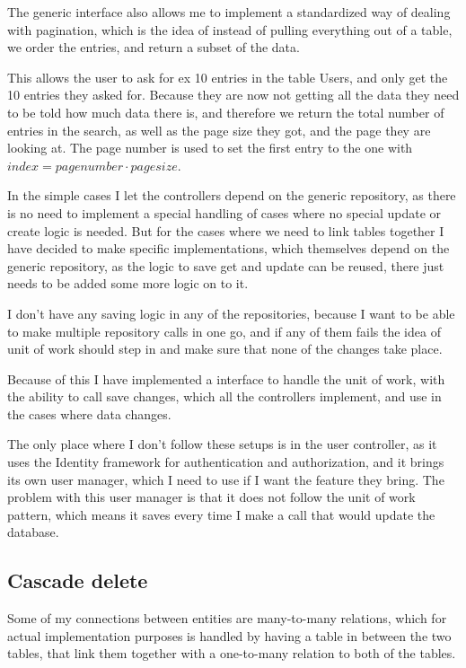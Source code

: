 The generic interface also allows me to implement a standardized way of dealing
with pagination, which is the idea of instead of pulling everything out of a
table, we order the entries, and return a subset of the data. 

This allows the user to ask for ex 10 entries in the table Users, and only get
the 10 entries they asked for. Because they are now not getting all the data
they need to be told how much data there is, and therefore we return the total
number of entries in the search, as well as the page size they got, and the page
they are looking at. The page number is used to set the first entry to the one
with $index = page number \cdot page size$. 

In the simple cases I let the controllers depend on the generic repository, as
there is no need to implement a special handling of cases where no special
update or create logic is needed. But for the cases where we need to link tables
together I have decided to make specific implementations, which themselves
depend on the generic repository, as the logic to save get and update can be
reused, there just needs to be added some more logic on to it. 

I don't have any saving logic in any of the repositories, because I want to be
able to make multiple repository calls in one go, and if any of them fails the
idea of unit of work should step in and make sure that none of the changes take
place. 

Because of this I have implemented a interface to handle the unit of work, with
the ability to call save changes, which all the controllers implement, and use
in the cases where data changes. 

The only place where I don't follow these setups is in the user controller, as
it uses the Identity framework for authentication and authorization, and it
brings its own user manager, which I need to use if I want the feature they
bring. The problem with this user manager is that it does not follow the unit of
work pattern, which means it saves every time I make a call that would update
the database. 

\subsection{Cascade delete}
Some of my connections between entities are many-to-many relations, which for
actual implementation purposes is handled by having a table in between the two
tables, that link them together with a one-to-many relation to both of the
tables. 

